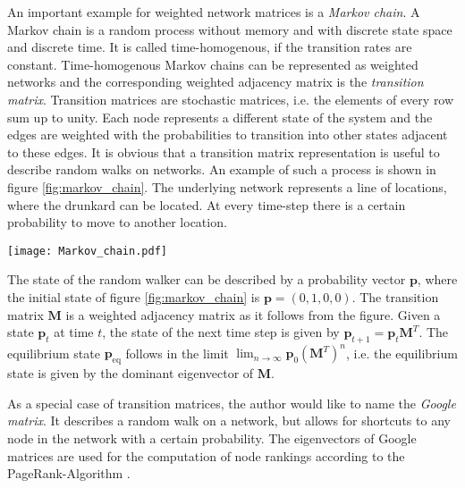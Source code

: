 An important example for weighted network matrices is a \emph{Markov chain}.
A Markov chain is a random process without memory and with discrete state space and discrete time.
It is called time-homogenous, if the transition rates are constant.
Time-homogenous Markov chains can be represented as weighted networks and the corresponding weighted adjacency matrix is the \emph{transition matrix}.
Transition matrices are stochastic matrices, i.e. the elements of every row sum up to unity.
Each node represents a different state of the system and the edges are weighted with the probabilities to transition into other states adjacent to these edges.
It is obvious that a transition matrix representation is useful to describe random walks on networks.
An example of such a process is shown in figure \ref{fig:markov_chain}.
The underlying network represents a line of locations, where the drunkard can be located.
At every time-step there is a certain probability to move to another location.
%
\begin{SCfigure}%
\texttt{[image: Markov\_chain.pdf]}
\caption{Trajectory of a toddling drunk man as an example of a Markov chain.
At every location there is a probability for the drunkard to go left or right.
The node rightmost node is an absorbing state and could model a park bench.
Weights at arrowheads mark the transition probability.
(inspired by \citep{Aldous_book}).}
\label{fig:markov_chain}
\end{SCfigure}
%
The state of the random walker can be described by a probability vector $\mathbf{p}$, where the initial state of figure \ref{fig:markov_chain} is $\mathbf{p}=(0,1,0,0)$.
The transition matrix $\mathbf{M}$ is a weighted adjacency matrix as it follows from the figure.
Given a state $\mathbf{p}_{t}$ at time $t$, the state of the next time step is given by $\mathbf{p}_{t+1}=\mathbf{p}_t \mathbf{M}^T$.
The equilibrium state $\mathbf{p}_\mathrm{eq}$ follows in the limit $\lim _{n\rightarrow \infty } \mathbf{p}_0 (\mathbf{M}^T)^n$, i.e. the equilibrium state is given by the dominant eigenvector of $\mathbf{M}$.

As a special case of transition matrices, the author would like to name the \emph{Google matrix}.
It describes a random walk on a network, but allows for shortcuts to any node in the network with a certain probability.
The eigenvectors of Google matrices are used for the computation of node rankings according to the PageRank-Algorithm \citep{PageRank:}.

